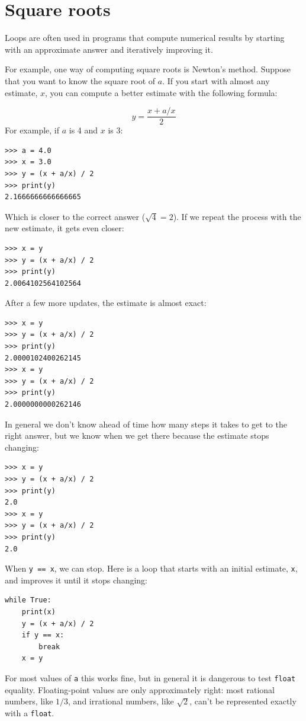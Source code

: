 \documentclass[10pt]{book}
\begin{document}
\section{Square roots}


Loops are often used in programs that compute
numerical results by starting with an approximate answer and
iteratively improving it.


For example, one way of computing square roots is Newton's method.
Suppose that you want to know the square root of $a$.  If you start
with almost any estimate, $x$, you can compute a better
estimate with the following formula:

\[ y = \frac{x + a/x}{2} \]
%
For example, if $a$ is 4 and $x$ is 3:

\beforeverb
\begin{verbatim}
>>> a = 4.0
>>> x = 3.0
>>> y = (x + a/x) / 2
>>> print(y)
2.1666666666666665
\end{verbatim}
\afterverb
%
Which is closer to the correct answer ($\sqrt{4} = 2$).  If we
repeat the process with the new estimate, it gets even closer:

\beforeverb
\begin{verbatim}
>>> x = y
>>> y = (x + a/x) / 2
>>> print(y)
2.0064102564102564
\end{verbatim}
\afterverb
%
After a few more updates, the estimate is almost exact:


\beforeverb
\begin{verbatim}
>>> x = y
>>> y = (x + a/x) / 2
>>> print(y)
2.0000102400262145
>>> x = y
>>> y = (x + a/x) / 2
>>> print(y)
2.0000000000262146
\end{verbatim}
\afterverb
%
In general we don't know ahead of time how many steps it takes
to get to the right answer, but we know when we get there
because the estimate
stops changing:

\beforeverb
\begin{verbatim}
>>> x = y
>>> y = (x + a/x) / 2
>>> print(y)
2.0
>>> x = y
>>> y = (x + a/x) / 2
>>> print(y)
2.0
\end{verbatim}
\afterverb
%
When {\tt y == x}, we can stop.  Here is a loop that starts
with an initial estimate, {\tt x}, and improves it until it
stops changing:

\beforeverb
\begin{verbatim}
while True:
    print(x)
    y = (x + a/x) / 2
    if y == x:
        break
    x = y
\end{verbatim}
\afterverb
%
For most values of {\tt a} this works fine, but in general it is
dangerous to test {\tt float} equality.
Floating-point values are only approximately right:
most rational numbers, like $1/3$, and irrational numbers, like
$\sqrt{2}$, can't be represented exactly with a {\tt float}.
\end{document}
